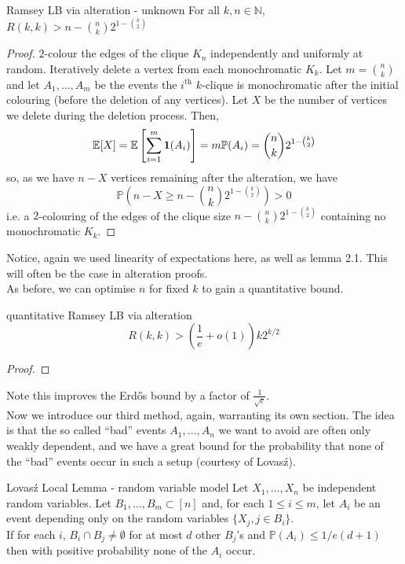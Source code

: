 \documentclass{article}
\begin{document}
\begin{proposition}[]{Ramsey LB via alteration - unknown}
    For all $k, n \in \mathbb{N}$, $R(k,k) > n - \binom{n}{k}2^{1-\binom{k}{2}}$
\end{proposition}

\begin{proof}
    $2$-colour the edges of the clique $K_n$ independently and uniformly at random. Iteratively delete a vertex 
    from each monochromatic $K_k$. Let $m = \binom{n}{k}$ and let $A_1, \dots, A_m$ be the events the $i^\text{th}$ 
    $k$-clique is monochromatic after the initial colouring (before the deletion of any vertices). Let $X$ be the 
    number of vertices we delete during the deletion process. Then, 
    \[\mathbb{E}[X] = \mathbb{E}\left[\sum_{i = 1}^m {\bf 1}(A_i)\right] = m\mathbb{P}(A_i) = \binom{n}{k}2^{1-\binom{k}{2}}\]
    so, as we have $n - X$ vertices remaining after the alteration, we have 
    \[\mathbb{P}\left(n - X \geq n - \binom{n}{k}2^{1-\binom{k}{2}}\right) > 0\]
    i.e. a $2$-colouring of the edges of the clique size $n - \binom{n}{k}2^{1-\binom{k}{2}}$ containing no monochromatic 
    $K_k$. 
\end{proof}

Notice, again we used linearity of expectations here, as well as lemma 2.1. This will often be the case in 
alteration proofs. \\ 

As before, we can optimise $n$ for fixed $k$ to gain a quantitative bound.

\begin{proposition}[]{quantitative Ramsey LB via alteration}
    \[R(k, k) > \left(\frac{1}{e} + o(1)\right)k2^{k/2}\]
\end{proposition}

\begin{proof}

\end{proof}

Note this improves the Erd\H{o}s bound by a factor of $\frac{1}{\sqrt{e}}$. \\

Now we introduce our third method, again, warranting its own section. The idea is that the so called ``bad'' events
$A_1, \dots, A_n$ we want to avoid are often only weakly dependent, and we have a great bound for the probability 
that none of the ``bad'' events occur in such a setup (courtesy of Lovas\'{z}).

\begin{lemma}[]{Lovas\'{z} Local Lemma - random variable model}
    Let $X_1, \dots, X_n$ be independent random variables. Let $B_1, \dots, B_m \subset [n]$ and, for each
    $1 \leq i \leq m$, let $A_i$ be an event depending only on the random variables $\{X_j, j \in B_i\}$. \\ 
    
    If for each $i$, $B_i \cap B_j \neq \emptyset$ for at most $d$ other $B_j$'s and $\mathbb{P}(A_i) \leq 1/e(d+1)$ 
    then with positive probability none of the $A_i$ occur. 
\end{lemma}
\end{document}
